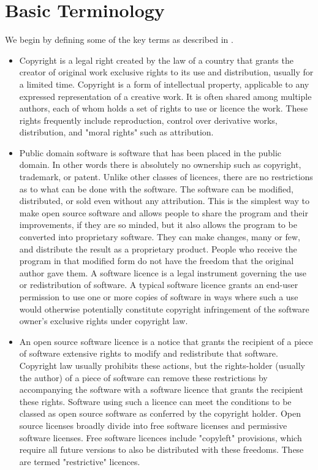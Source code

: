 \documentclass[12pt,a4paper]{article}
\begin{document}
\section{Basic Terminology}
\label{sec:BasicTerminology}

We begin by defining some of the key terms as described in \cite{[3]}.
\begin{itemize}
\item Copyright is a legal right created by the law of a country that grants the creator of original work exclusive rights to its use and distribution, usually for a limited time. Copyright is a form of intellectual property, applicable to any expressed representation of a creative work. It is often shared among multiple authors, each of whom holds a set of rights to use or licence the work. These rights frequently include reproduction, control over derivative works, distribution, and "moral rights" such as attribution.

\item Public domain software is software that has been placed in the public domain. In other words there is absolutely no ownership such as copyright, trademark, or patent. Unlike other classes of licences, there are no restrictions as to what can be done with the software. The software can be modified, distributed, or sold even without any attribution. This is the simplest way to make open source software and allows people to share the program and their improvements, if they are so minded, but it also allows the program to be converted into proprietary software. They can make changes, many or few, and distribute the result as a proprietary product. People who receive the program in that modified form do not have the freedom that the original author gave them. 
A software licence is a legal instrument governing the use or redistribution of software. A typical software licence grants an end-user permission to use one or more copies of software in ways where such a use would otherwise potentially constitute copyright infringement of the software owner's exclusive rights under copyright law.

\item An open source software licence is a notice that grants the recipient of a piece of software extensive rights to modify and redistribute that software. Copyright law usually prohibits these actions, but the rights-holder (usually the author) of a piece of software can remove these restrictions by accompanying the software with a software licence that grants the recipient these rights. Software using such a licence can meet the conditions to be classed as open source software as conferred by the copyright holder. Open source licenses broadly divide into free software licenses and permissive software licenses.
Free software licences include "copyleft" provisions, which require all future versions to also be distributed with these freedoms. These are termed "restrictive" licences. 


\end{itemize}
\end{document}

